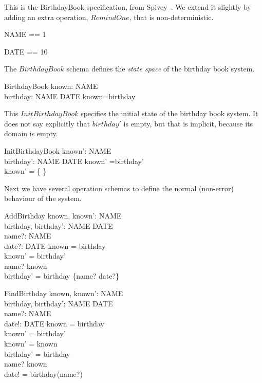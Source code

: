 \documentclass{article}
\begin{document}
This is the BirthdayBook specification, from 
Spivey~\cite{spivey:z-notation2}.  We extend it slightly
by adding an extra operation, $RemindOne$, that is non-deterministic.

\begin{zed}
   NAME == 1 
\end{zed}
\begin{zed}
   DATE == 10 
\end{zed}

The $BirthdayBook$ schema defines the \emph{state space} of 
the birthday book system. 

\begin{schema}{BirthdayBook}
    known: \power NAME \\
    birthday: NAME \pfun DATE
\where
    known=\dom birthday
\end{schema}

This $InitBirthdayBook$ specifies the initial state
of the birthday book system.  It does not say explicitly that
$birthday'$ is empty, but that is implicit, because its domain
is empty.

\begin{schema}{InitBirthdayBook}
    known': \power NAME \\
    birthday': NAME \pfun DATE
\where
    known' =\dom birthday' \\
    known' = \{ \}
\end{schema}

Next we have several operation schemas to define the normal (non-error)
behaviour of the system.

\begin{schema}{AddBirthday}
    known, known': \power NAME \\
    birthday, birthday': NAME \pfun DATE \\
    name?: NAME \\
    date?: DATE
\where
    known = \dom birthday \\
    known' = \dom birthday' \\
    name? \notin known
\\
    birthday' = birthday \cup \{name? \mapsto date?\}
\end{schema}

\begin{schema}{FindBirthday}
    known, known': \power NAME \\
    birthday, birthday': NAME \pfun DATE \\
    name?: NAME \\
    date!: DATE 
\where
    known = \dom birthday \\
    known' = \dom birthday' \\
    known' = known \\
    birthday' = birthday \\
    name? \in known
\\
    date! = birthday(name?)
\end{schema}
\end{document}
